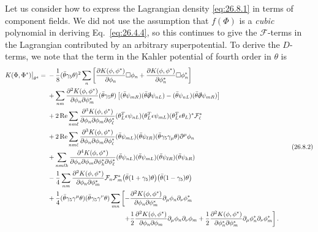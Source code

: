 Let us consider how to express the Lagrangian density \eqref{eq:26.8.1} in
terms of component fields. We did not use the assumption that \(f(\Phi)\) is
a \textit{cubic} polynomial in deriving Eq.~\eqref{eq:26.4.4}, so this
continues to give the \(\mathcal{F}\)-terms in the Lagrangian contributed by
an arbitrary superpotential. To derive the \(D\)-terms, we note that the term
in the Kahler potential of fourth order in \(\theta\) is
\begin{equation}
  \begin{aligned}
  K(\Phi,\Phi^*)\big|_{\theta^4}
  ={}&
  -\frac18(\bar\theta\gamma_5\theta)^2
  \sum_n\left[
    \frac{\partial K(\phi,\phi^*)}{\partial\phi_n}\Box\phi_n
    +\frac{\partial K(\phi,\phi^*)}{\partial\phi_n^*}\Box\phi_n^*
  \right]
  \\
  &+\sum_{nm}
  \frac{\partial^2K(\phi,\phi^*)}
       {\partial\phi_n\partial\phi_m^*}
  (\bar\theta\gamma_5\theta)
  \left[
    (\bar\theta\psi_{mR})(\bar\theta\sl{\partial}\psi_{nL})
    -(\bar\theta\psi_{nL})(\bar\theta\sl{\partial}\psi_{mR})
  \right]
  \\
  &+2\operatorname{Re}\sum_{nm\ell}
  \frac{\partial^3K(\phi,\phi^*)}
       {\partial\phi_n\partial\phi_m\partial\phi_\ell^*}
  (\theta_L^T\epsilon\psi_{nL})
  (\theta_L^T\epsilon\psi_{mL})
  (\theta_L^T\epsilon\theta_L)^*\mathcal{F}_\ell^*
  \\
  &+2\operatorname{Re}\sum_{nm\ell}
  \frac{\partial^3K(\phi,\phi^*)}
       {\partial\phi_n\partial\phi_m\partial\phi_\ell^*}
  (\bar\theta\psi_{mL})(\bar\theta\psi_{\ell R})
  (\bar\theta\gamma_5\gamma_\mu\theta)\partial^\mu\phi_n
  \\
  &+\sum_{nm\ell k}
  \frac{\partial^4K(\phi,\phi^*)}
       {\partial\phi_n\partial\phi_m
        \partial\phi_k^*\partial\phi_\ell^*}
  (\bar\theta\psi_{nL})(\bar\theta\psi_{mL})
  (\bar\theta\psi_{\ell R})(\bar\theta\psi_{kR})
  \\
  &-\frac14\sum_{nm}
  \frac{\partial^2K(\phi,\phi^*)}
       {\partial\phi_n\partial\phi_m^*}
  \mathcal{F}_n\mathcal{F}_m^*
  \bigl(\bar\theta(1+\gamma_5)\theta\bigr)
  \bigl(\bar\theta(1-\gamma_5)\theta\bigr)
  \\
  &+\frac14
  (\bar\theta\gamma_5\gamma^\mu\theta)
  (\bar\theta\gamma_5\gamma^\nu\theta)
  \sum_{mn}\left[
    -\frac{\partial^2K(\phi,\phi^*)}
          {\partial\phi_n\partial\phi_m^*}
      \partial_\mu\phi_n\partial_\nu\phi_m^*
  \right.
  \\
  &\hspace{41mm}\left.
    +\frac12
      \frac{\partial^2K(\phi,\phi^*)}
           {\partial\phi_n\partial\phi_m}
      \partial_\mu\phi_n\partial_\nu\phi_m
    +\frac12
      \frac{\partial^2K(\phi,\phi^*)}
           {\partial\phi_n^*\partial\phi_m^*}
      \partial_\mu\phi_n^*\partial_\nu\phi_m^*
  \right] .
  \end{aligned}
  \tag{26.8.2}\label{eq:26.8.2}
\end{equation}
